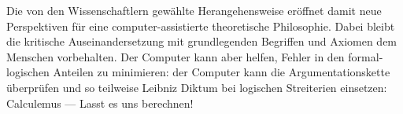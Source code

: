 \documentclass{article}
\begin{document}
Die von den Wissenschaftlern gewählte Herangehensweise eröffnet damit
neue Perspektiven für eine computer-assistierte theoretische
Philosophie. Dabei bleibt die kritische Auseinandersetzung mit
grundlegenden Begriffen und Axiomen dem Menschen vorbehalten. Der
Computer kann aber helfen, Fehler in den formal-logischen Anteilen zu
minimieren: der Computer kann die Argumentationskette überprüfen und so
teilweise Leibniz Diktum bei logischen Streiterien einsetzen:
Calculemus --- Lasst es uns berechnen!
\end{document}
